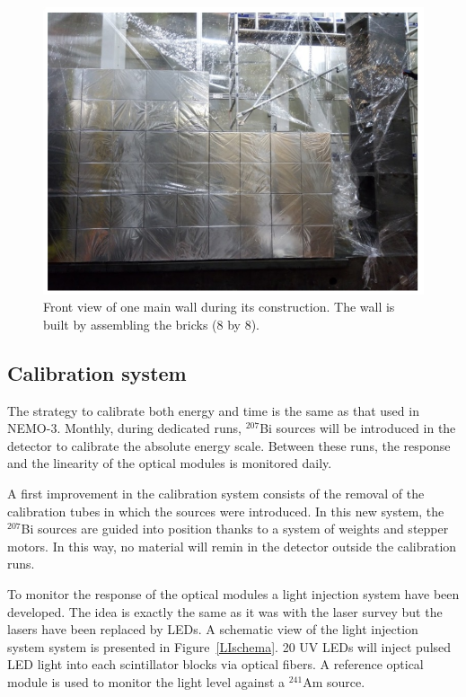 \documentclass[main.tex]{subfiles}
\begin{document}
\begin{figure}[h!]
\begin{center}
\includegraphics[scale=0.5]{pictures/Chap3/FrontViewCalo.png}
\caption{Front view of one main wall during its construction. The wall is built by assembling the bricks (8 by 8).}
\label{SnemoCaloFrontView}
\end{center}
\end{figure}

\FloatBarrier


\subsection{Calibration system}


\NI The strategy to calibrate both energy and time is the same as that used in NEMO-3. Monthly, during dedicated runs, $^{\text{207}}$Bi sources will be introduced in the detector to calibrate the absolute energy scale. Between these runs, the response and the linearity of the optical modules is monitored daily. 


\bigskip


\NI A first improvement in the calibration system consists of the removal of the calibration tubes in which the sources were introduced. In this new system, the $^{\text{207}}$Bi sources are guided into position thanks to a system of weights and stepper motors. In this way, no material will remin in the detector outside the calibration runs.


\bigskip


\NI To monitor the response of the optical modules a light injection system have been developed. The idea is exactly the same as it was with the laser survey but the lasers have been replaced by LEDs. A schematic view of the light injection system system is presented in Figure~\ref{LIschema}. 20 UV LEDs will inject pulsed LED light into each scintillator blocks via optical fibers. A reference optical module is used to monitor the light level against a $^{\text{241}}$Am source.
\end{document}
